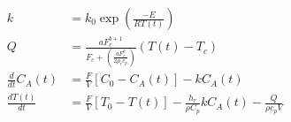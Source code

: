 \begin{equation}
  \begin{aligned}
    k                     & = k_{0} \exp(\frac{-E}{RT(t)})
    \\
    Q                     & = \frac{aF_{c}^{b+1}}{F_{c} + (\frac{aF_{c}^{b}}{2\rho_{c}c_{p}})}(T(t)-T_{c})
    \label{eq:CSTR_1storder02_2}
    \\
    \frac{d}{dt} C_{A}(t) & = \frac{F}{V}[C_{0} - C_{A}(t)] - k C_{A}(t)
    \\
    \frac{dT(t)}{dt}      & = \frac{F}{V} [T_{0}-T(t)] - \frac{h_{r}}{\rho C_{p}}k C_{A}(t) - \frac{Q}{\rho c_{p} V}
  \end{aligned}
\end{equation}